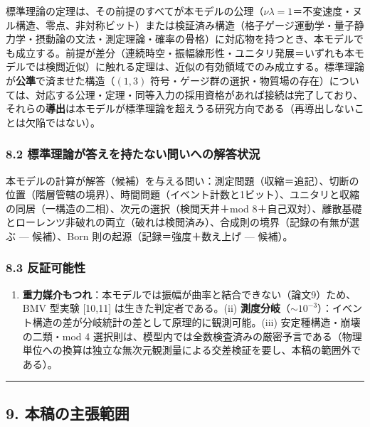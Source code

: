 \documentclass[
]{ltjsarticle}
\providecommand{\tightlist}{%
  \setlength{\itemsep}{0pt}\setlength{\parskip}{0pt}}
\begin{document}
標準理論の定理は、その前提のすべてが本モデルの公理（\(\nu\lambda=1\)＝不変速度・ヌル構造、零点、非対称ビット）または検証済み構造（格子ゲージ運動学・量子静力学・摂動論の文法・測定理論・確率の骨格）に対応物を持つとき、本モデルでも成立する。前提が差分（連続時空・振幅線形性・ユニタリ発展＝いずれも本モデルでは検閲近似）に触れる定理は、近似の有効領域でのみ成立する。標準理論が\textbf{公準}で済ませた構造（\((1,3)\)
符号・ゲージ群の選択・物質場の存在）については、対応する公理・定理・同等入力の採用資格があれば接続は完了しており、それらの\textbf{導出}は本モデルが標準理論を超えうる研究方向である（再導出しないことは欠陥ではない）。

\subsubsection{8.2
標準理論が答えを持たない問いへの解答状況}\label{ux6a19ux6e96ux7406ux8ad6ux304cux7b54ux3048ux3092ux6301ux305fux306aux3044ux554fux3044ux3078ux306eux89e3ux7b54ux72b6ux6cc1}

本モデルの計算が解答（候補）を与える問い：測定問題（収縮＝追記）、切断の位置（階層管轄の境界）、時間問題（イベント計数と1ビット）、ユニタリと収縮の同居（一構造の二相）、次元の選択（検閲天井＋mod
8＋自己双対）、離散基礎とローレンツ非破れの両立（破れは検閲済み）、合成則の境界（記録の有無が選ぶ
--- 候補）、Born 則の起源（記録＝強度＋数え上げ --- 候補）。

\subsubsection{8.3 反証可能性}\label{ux53cdux8a3cux53efux80fdux6027}

\begin{enumerate}
\def\labelenumi{(\roman{enumi})}
\tightlist
\item
  \textbf{重力媒介もつれ}：本モデルでは振幅が曲率と結合できない（論文9）ため、BMV
  型実験 {[}10,11{]} は生きた判定者である。(ii)
  \textbf{測度分岐}（\(\sim10^{-3}\)）：イベント構造の差が分岐統計の差として原理的に観測可能。(iii)
  安定種構造・崩壊の二類・mod 4
  選択則は、模型内では全数検査済みの厳密予言である（物理単位への換算は独立な無次元観測量による交差検証を要し、本稿の範囲外である）。
\end{enumerate}

\begin{center}\rule{0.5\linewidth}{0.5pt}\end{center}

\subsection{9.
本稿の主張範囲}\label{ux672cux7a3fux306eux4e3bux5f35ux7bc4ux56f2}
\end{document}
